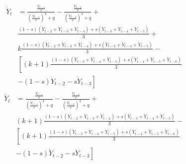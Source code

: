 \begin{equation*}
\begin{split}
    \dot Y_{t}& = \frac{\frac{\dot Y_{t-1}}{v}}{\left(\frac{\dot Y_{t-1}}{v}\right)^4+q}-\frac{\frac{\dot Y_{t-2}}{v}}{\left(\frac{\dot Y_{t-2}}{v}\right)^4+q} + \\
    & \frac{(1-s)(\dot Y_{t-2}+\dot Y_{t-3}+\dot Y_{t-4})+s(\dot Y_{t-3}+\dot Y_{t-4}+\dot Y_{t-5})}{3} + \\
    &k\frac{(1-s)(\dot Y_{t-2}+\dot Y_{t-3}+\dot Y_{t-4})+s(\dot Y_{t-3}+\dot Y_{t-4}+\dot Y_{t-5})}{3}-\\
    &\left[(k+1)\frac{(1-s)(\dot Y_{t-3}+\dot Y_{t-4}+\dot Y_{t-5})+s(\dot Y_{t-4}+\dot Y_{t-5}+\dot Y_{t-6})}{3}\right.\\
    &\left.-(1-s)\dot Y_{t-2}-s\dot Y_{t-3}\right]
\end{split}
\end{equation*}
\begin{equation}
\begin{split}
    \dot Y_{t}& = \frac{\frac{\dot Y_{t-1}}{v}}{\left(\frac{\dot Y_{t-1}}{v}\right)^4+q}-\frac{\frac{\dot Y_{t-2}}{v}}{\left(\frac{\dot Y_{t-2}}{v}\right)^4+q} + \\
    & (k+1)\frac{(1-s)(\dot Y_{t-2}+\dot Y_{t-3}+\dot Y_{t-4})+s(\dot Y_{t-3}+\dot Y_{t-4}+\dot Y_{t-5})}{3} -\\
    &\left[(k+1)\frac{(1-s)(\dot Y_{t-3}+\dot Y_{t-4}+\dot Y_{t-5})+s(\dot Y_{t-4}+\dot Y_{t-5}+\dot Y_{t-6})}{3}\right.\\
    &\left.-(1-s)\dot Y_{t-2}-s\dot Y_{t-3}\right]
\end{split}
\end{equation}
\newpage
